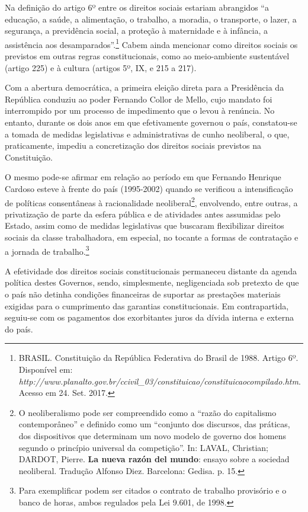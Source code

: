 Na definição do artigo 6º entre os direitos sociais estariam abrangidos
``a educação, a saúde, a alimentação, o trabalho, a moradia, o
transporte, o lazer, a segurança, a previdência social, a proteção à
maternidade e à infância, a assistência aos desamparados''.\footnote{BRASIL.
  Constituição da República Federativa do Brasil de 1988. Artigo 6º.
  Disponível em: \emph{http://www.planalto.gov.br/ccivil\_03/constituicao/constituicaocompilado.htm}.
  Acesso em 24. Set. 2017.} Cabem ainda mencionar como direitos sociais
os previstos em outras regras constitucionais, como ao meio-ambiente
sustentável (artigo 225) e à cultura (artigos 5º, IX, e 215 a 217).

Com a abertura democrática, a primeira eleição direta para a Presidência
da República conduziu ao poder Fernando Collor de Mello, cujo mandato
foi interrompido por um processo de impedimento que o levou à renúncia.
No entanto, durante os dois anos em que efetivamente governou o país,
constatou-se a tomada de medidas legislativas e administrativas de cunho
neoliberal, o que, praticamente, impediu a concretização dos direitos
sociais previstos na Constituição.

O mesmo pode-se afirmar em relação ao período em que Fernando Henrique
Cardoso esteve à frente do país (1995-2002) quando se verificou a
intensificação de políticas consentâneas à racionalidade
neoliberal\footnote{O neoliberalismo pode ser compreendido como a
  ``razão do capitalismo contemporâneo'' e definido como um ``conjunto
  dos discursos, das práticas, dos dispositivos que determinam um novo
  modelo de governo dos homens segundo o princípio universal da
  competição''. In: LAVAL, Christian; DARDOT, Pierre. \textbf{La nueva
  razón del mundo}: ensayo sobre a sociedad neoliberal. Tradução Alfonso
  Diez. Barcelona: Gedisa. p. 15.}, envolvendo, entre outras, a
privatização de parte da esfera pública e de atividades antes assumidas
pelo Estado, assim como de medidas legislativas que buscaram
flexibilizar direitos sociais da classe trabalhadora, em especial, no
tocante a formas de contratação e a jornada de trabalho.\footnote{Para
  exemplificar podem ser citados o contrato de trabalho provisório e o
  banco de horas, ambos regulados pela Lei 9.601, de 1998.}

A efetividade dos direitos sociais constitucionais permaneceu distante
da agenda política destes Governos, sendo, simplesmente, negligenciada
sob pretexto de que o país não detinha condições financeiras de suportar
as prestações materiais exigidas para o cumprimento das garantias
constitucionais. Em contrapartida, seguiu-se com os pagamentos dos
exorbitantes juros da dívida interna e externa do país.

